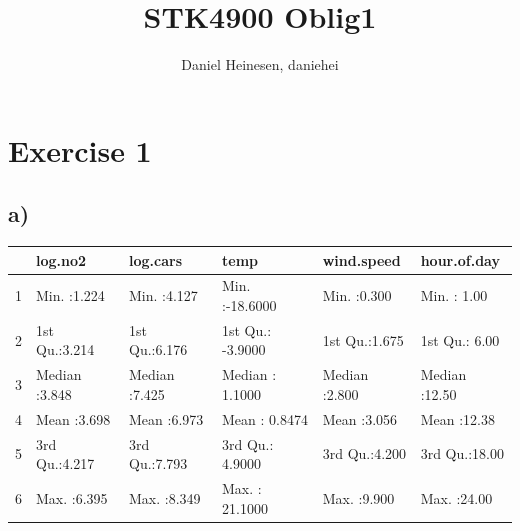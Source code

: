 \documentclass[a4paper,norsk, 10pt]{article}
\title{STK4900 Oblig1}
\author{Daniel Heinesen, daniehei}
\begin{document}
\maketitle


\section*{Exercise 1}


\subsection*{a)}
\begin{table}[ht]
\centering
\begin{tabular}{rlllll}
  \hline
 &    log.no2 &    log.cars &      temp &   wind.speed &  hour.of.day \\ 
  \hline
1 & Min.   :1.224   & Min.   :4.127   & Min.   :-18.6000   & Min.   :0.300   & Min.   : 1.00   \\ 
  2 & 1st Qu.:3.214   & 1st Qu.:6.176   & 1st Qu.: -3.9000   & 1st Qu.:1.675   & 1st Qu.: 6.00   \\ 
  3 & Median :3.848   & Median :7.425   & Median :  1.1000   & Median :2.800   & Median :12.50   \\ 
  4 & Mean   :3.698   & Mean   :6.973   & Mean   :  0.8474   & Mean   :3.056   & Mean   :12.38   \\ 
  5 & 3rd Qu.:4.217   & 3rd Qu.:7.793   & 3rd Qu.:  4.9000   & 3rd Qu.:4.200   & 3rd Qu.:18.00   \\ 
  6 & Max.   :6.395   & Max.   :8.349   & Max.   : 21.1000   & Max.   :9.900   & Max.   :24.00   \\ 
   \hline
\end{tabular}
\end{table}
\end{document}
